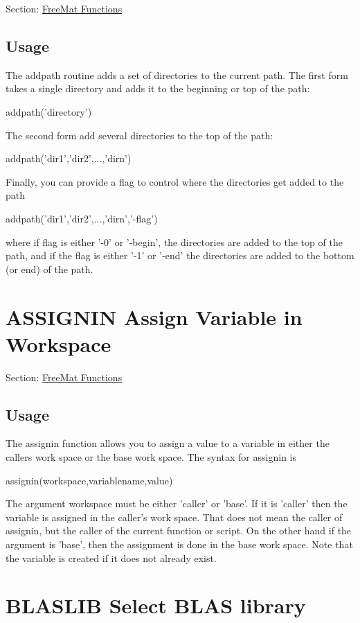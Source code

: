 Section\-: \hyperlink{sec_freemat}{Free\-Mat Functions} \hypertarget{vtkwidgets_vtkxyplotwidget_Usage}{}\subsection{Usage}\label{vtkwidgets_vtkxyplotwidget_Usage}
The {\ttfamily addpath} routine adds a set of directories to the current path. The first form takes a single directory and adds it to the beginning or top of the path\-: \begin{DoxyVerb}  addpath('directory')
\end{DoxyVerb}
 The second form add several directories to the top of the path\-: \begin{DoxyVerb}  addpath('dir1','dir2',...,'dirn')
\end{DoxyVerb}
 Finally, you can provide a flag to control where the directories get added to the path \begin{DoxyVerb}  addpath('dir1','dir2',...,'dirn','-flag')
\end{DoxyVerb}
 where if {\ttfamily flag} is either {\ttfamily '-\/0'} or {\ttfamily '-\/begin'}, the directories are added to the top of the path, and if the {\ttfamily flag} is either {\ttfamily '-\/1'} or {\ttfamily '-\/end'} the directories are added to the bottom (or end) of the path. \hypertarget{freemat_assignin}{}\section{A\-S\-S\-I\-G\-N\-I\-N Assign Variable in Workspace}\label{freemat_assignin}
Section\-: \hyperlink{sec_freemat}{Free\-Mat Functions} \hypertarget{vtkwidgets_vtkxyplotwidget_Usage}{}\subsection{Usage}\label{vtkwidgets_vtkxyplotwidget_Usage}
The {\ttfamily assignin} function allows you to assign a value to a variable in either the callers work space or the base work space. The syntax for {\ttfamily assignin} is \begin{DoxyVerb}   assignin(workspace,variablename,value)
\end{DoxyVerb}
 The argument {\ttfamily workspace} must be either 'caller' or 'base'. If it is 'caller' then the variable is assigned in the caller's work space. That does not mean the caller of {\ttfamily assignin}, but the caller of the current function or script. On the other hand if the argument is 'base', then the assignment is done in the base work space. Note that the variable is created if it does not already exist. \hypertarget{freemat_blaslib}{}\section{B\-L\-A\-S\-L\-I\-B Select B\-L\-A\-S library}\label{freemat_blaslib}
